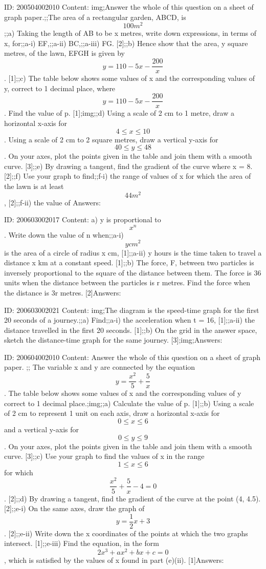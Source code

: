 \documentclass{article}
\begin{document}
ID: 200504002010
Content:
img;Answer the whole of this question on a sheet of graph paper.;;The area of a rectangular garden, ABCD, is $$100 m^2$$;;a) Taking the length of AB to be x metres, write down expressions, in terms of x, for;;a-i) EF,;;a-ii) BC,;;a-iii) FG. [2];;b) Hence show that the area, y square metres, of the lawn, EFGH is given by $$y=110-5x-\frac{200}{x}$$. [1];;c) The table below shows some values of x and the corresponding values of y, correct to 1 decimal place, where $$y=110-5x-\frac{200}{x}$$. Find the value of p. [1];img;;d) Using a scale of 2 cm to 1 metre, draw a horizontal x-axis for $$4\leq x\leq 10$$. Using a scale of 2 cm to 2 square metres, draw a vertical y-axis for $$40\leq y\leq 48$$. On your axes, plot the points given in the table and join them with a smooth curve. [3];;e) By drawing a tangent, find the gradient of the curve where x = 8. [2];;f) Use your graph to find;;f-i) the range of values of x for which the area of the lawn is at least $$44 m^{2} $$, [2];;f-ii) the value of Answers:

ID: 200603002017
Content:
a) y is proportional to $$x^{n}$$. Write down the value of n when;;a-i) $$y cm^{2} $$ is the area of a circle of radius x cm, [1];;a-ii) y hours is the time taken to travel a distance x km at a constant speed. [1];;b) The force, F, between two particles is inversely proportional to the square of the distance between them. The force is 36 units when the distance between the particles	is r metres. Find the force when the distance is 3r metres. [2]Answers:

ID: 200603002021
Content:
img;The diagram is the speed-time graph for the first 20 seconds of a journey.;;a) Find;;a-i) the acceleration when t = 16, [1];;a-ii) the distance travelled in the first 20 seconds. [1];;b) On the grid in the answer space, sketch the distance-time graph for the same journey. [3];img;Answers:

ID: 200604002010
Content:
Answer the whole of this question on a sheet of graph paper. ;; The variable x and y are connected by the equation $$y=\frac{x^{2}}{5}+\frac{5}{x}$$. The table below shows some values of x and the corresponding values of y correct to 1 decimal place.;img;;a) Calculate the value of p. [1];;b) Using a scale of 2 cm to represent 1 unit on each axis, draw a horizontal x-axis for $$0\leq x\leq 6$$ and a vertical y-axis for $$0\leq y\leq 9$$. On your axes, plot the points given in the table and join them with a smooth curve. [3];;c) Use your graph to find the values of x in the range $$1\leq x\leq 6$$ for which $$\frac{x^{2}}{5}+\frac{5}{x}-4=0$$. [2];;d) By drawing a tangent, find the gradient of the curve at the point (4, 4.5). [2];;e-i) On the same axes, draw the graph of $$y=\frac{1}{2}x+3$$. [2];;e-ii) Write down the x coordinates of the points at which the two graphs intersect. [1];;e-iii) Find the equation, in the form $$2x^{3} +ax^{2} +bx+c=0$$, which is satisfied by the values of x found in part (e)(ii). [1]Answers:
\end{document}
